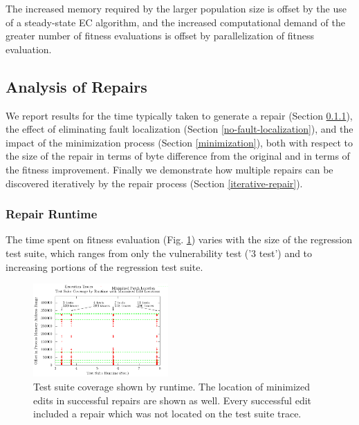 \documentclass{sigcomm-alternate}
\begin{document}
{The increased memory required by the larger population size is offset
by the use of a steady-state EC algorithm, and the increased
computational demand of the greater number of fitness evaluations is
offset by parallelization of fitness evaluation.

\subsection{Analysis of Repairs}
\label{analysis}

We report results for the time typically taken to generate a repair
(Section \ref{runtime}), the effect of eliminating fault localization
(Section \ref{no-fault-localization}), and the impact of the
minimization process (Section \ref{minimization}), both with respect
to the size of the repair in terms of byte difference from the
original and in terms of the fitness improvement.  Finally we
demonstrate how multiple repairs can be discovered iteratively by the
repair process (Section \ref{iterative-repair}).

\subsubsection{Repair Runtime}
\label{runtime}
The time spent on fitness evaluation (Fig. \ref{ts-cov-rt-w-min}) varies with the size of
the regression test suite, which ranges from only the vulnerability test ('3 test')
and to 
 increasing portions of the regression test
suite.

\begin{figure}[htb]
  \centering
  \includegraphics[width=0.46\textwidth]{ts-cov-and-runtime-w-min.pdf}  
  \caption{Test suite coverage shown by runtime.  The location of
    minimized edits in successful repairs are shown as well.  Every
    successful edit included a repair which was not located on the
    test suite trace.}
  \label{ts-cov-rt-w-min}
\end{figure}

}
\end{document}

